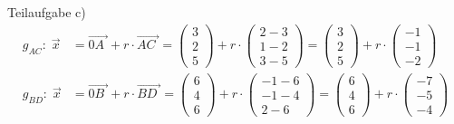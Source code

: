 \begin{exercise}
    Teilaufgabe c)
    \begin{equation*}
    \begin{split}
    g_{AC}:\;\vec{x}
    &=\overrightarrow{0A\;}+r\cdot\overrightarrow{AC\;}
    =
    \begin{pmatrix}
      \num{3} \\
      \num{2} \\
      \num{5}
    \end{pmatrix}
    +r\cdot
    \begin{pmatrix}
      \num{2} - \num{3} \\
      \num{1} - \num{2} \\
      \num{3} - \num{5}
    \end{pmatrix}
    =
    \begin{pmatrix}
      \num{3} \\
      \num{2} \\
      \num{5}
    \end{pmatrix}
    +r\cdot
    \begin{pmatrix}
      -\num{1} \\
      -\num{1} \\
      -\num{2}
    \end{pmatrix}
    \\[1ex]
    g_{BD}:\;\vec{x}
    &=\overrightarrow{0B\;}+r\cdot\overrightarrow{BD\;}
    =
    \begin{pmatrix}
      \num{6} \\
      \num{4} \\
      \num{6}
    \end{pmatrix}
    +r\cdot
    \begin{pmatrix}
      -\num{1} - \num{6} \\
      -\num{1} - \num{4} \\
      \num{2} - \num{6}
    \end{pmatrix}
    =
    \begin{pmatrix}
      \num{6} \\
      \num{4} \\
      \num{6}
    \end{pmatrix}
    +r\cdot
    \begin{pmatrix}
      -\num{7} \\
      -\num{5} \\
      -\num{4}
    \end{pmatrix}
    \end{split}
    \end{equation*}
    \par

\end{exercise}
